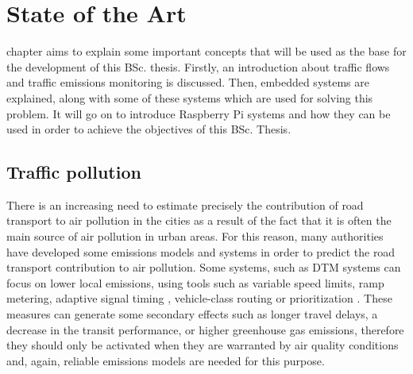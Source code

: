 
\chapter{State of the Art}
\label{chap:state_of_the_art}

 chapter aims to explain some important concepts that will be used as the base for the development of this \ac{BSc.} thesis. Firstly, an introduction about traffic flows and traffic emissions monitoring is discussed. Then, embedded systems are explained, along with some of these systems which are used for solving this problem. It will go on to introduce Raspberry Pi systems and how they can be used in order to achieve the objectives of this \ac{BSc.} Thesis.

\section{Traffic pollution}

There is an increasing need to estimate precisely the contribution of road transport to air pollution in the cities as a result of the fact that it is often the main source of air pollution in urban areas. For this reason, many authorities have developed some emissions models and systems in order to predict the road transport contribution to air pollution. Some systems, such as \ac{DTM} systems can focus on lower local emissions, using tools such as variable speed limits, ramp metering, adaptive signal timing \cite{MK10}, vehicle-class routing or prioritization \cite{ZDHB09}. These measures can generate some secondary effects such as longer travel delays, a decrease in the transit performance, or higher greenhouse gas emissions, therefore they should only be activated when they are warranted by air quality conditions \cite{EMA09} and, again, reliable emissions models are needed for this purpose. 


